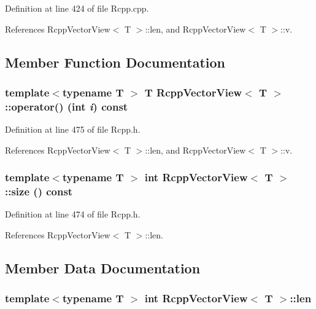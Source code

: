 Definition at line 424 of file Rcpp.cpp.

References RcppVectorView$<$ T $>$::len, and RcppVectorView$<$ T $>$::v.

\subsection{Member Function Documentation}
\hypertarget{classRcppVectorView_13d63e990363a37ae29e0eab7400d297}{
\subsubsection[{operator()}]{\setlength{\rightskip}{0pt plus 5cm}template$<$typename T $>$ T {\bf RcppVectorView}$<$ T $>$::operator() (int {\em i}) const}}
\label{classRcppVectorView_13d63e990363a37ae29e0eab7400d297}




Definition at line 475 of file Rcpp.h.

References RcppVectorView$<$ T $>$::len, and RcppVectorView$<$ T $>$::v.\hypertarget{classRcppVectorView_d4c0f21296eb1cf7b2e2c8b8b43f4b0d}{
\subsubsection[{size}]{\setlength{\rightskip}{0pt plus 5cm}template$<$typename T $>$ int {\bf RcppVectorView}$<$ T $>$::size () const}}
\label{classRcppVectorView_d4c0f21296eb1cf7b2e2c8b8b43f4b0d}




Definition at line 474 of file Rcpp.h.

References RcppVectorView$<$ T $>$::len.

\subsection{Member Data Documentation}
\hypertarget{classRcppVectorView_da67f9b1481099e4a820deaf4648778b}{
\subsubsection[{len}]{\setlength{\rightskip}{0pt plus 5cm}template$<$typename T $>$ int {\bf RcppVectorView}$<$ T $>$::{\bf len}}}
\label{classRcppVectorView_da67f9b1481099e4a820deaf4648778b}




